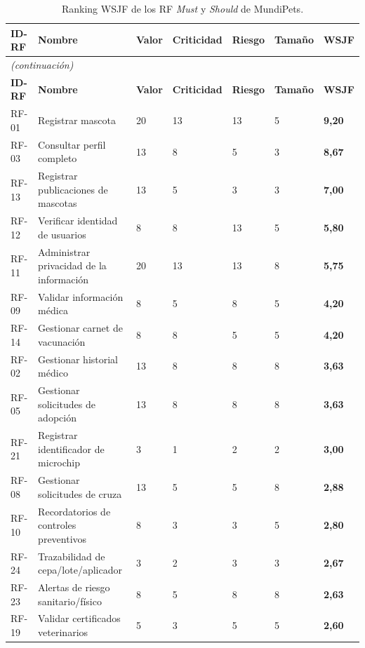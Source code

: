 \documentclass[journal,onecolumn]{IEEEtran}
\begin{document}
	\begin{longtable}{@{}p{1.4cm} p{5.4cm} p{1.5cm} p{1.5cm} p{1.5cm} p{1.5cm} p{1.3cm}@{}}
		\caption{Ranking WSJF de los RF \emph{Must} y \emph{Should} de MundiPets.}
		\label{tab:wsjf} \\
		\hline
		\textbf{ID-RF} & \textbf{Nombre} & \textbf{Valor} & \textbf{Criticidad} & \textbf{Riesgo} & \textbf{Tamaño} & \textbf{WSJF} \\
		\hline
		\endfirsthead
		\multicolumn{7}{|l|}{\textit{(continuación)}} \\
		\hline
		\textbf{ID-RF} & \textbf{Nombre} & \textbf{Valor} & \textbf{Criticidad} & \textbf{Riesgo} & \textbf{Tamaño} & \textbf{WSJF} \\
		\hline
		\endhead
		\hline
		\endfoot
		RF-01 & Registrar mascota & 20 & 13 & 13 & 5 & \textbf{9,20} \\
		\hline
		RF-03 & Consultar perfil completo & 13 & 8 & 5 & 3 & \textbf{8,67} \\
		\hline
		RF-13 & Registrar publicaciones de mascotas & 13 & 5 & 3 & 3 & \textbf{7,00} \\
		\hline
		RF-12 & Verificar identidad de usuarios & 8 & 8 & 13 & 5 & \textbf{5,80} \\
		\hline
		RF-11 & Administrar privacidad de la información & 20 & 13 & 13 & 8 & \textbf{5,75} \\
		\hline
		RF-09 & Validar información médica & 8 & 5 & 8 & 5 & \textbf{4,20} \\
		\hline
		RF-14 & Gestionar carnet de vacunación & 8 & 8 & 5 & 5 & \textbf{4,20} \\
		\hline
		RF-02 & Gestionar historial médico & 13 & 8 & 8 & 8 & \textbf{3,63} \\
		\hline
		RF-05 & Gestionar solicitudes de adopción & 13 & 8 & 8 & 8 & \textbf{3,63} \\
		\hline
		RF-21 & Registrar identificador de microchip & 3 & 1 & 2 & 2 & \textbf{3,00} \\
		\hline
		RF-08 & Gestionar solicitudes de cruza & 13 & 5 & 5 & 8 & \textbf{2,88} \\
		\hline
		RF-10 & Recordatorios de controles preventivos & 8 & 3 & 3 & 5 & \textbf{2,80} \\
		\hline
		RF-24 & Trazabilidad de cepa/lote/aplicador & 3 & 2 & 3 & 3 & \textbf{2,67} \\
		\hline
		RF-23 & Alertas de riesgo sanitario/físico & 8 & 5 & 8 & 8 & \textbf{2,63} \\
		\hline
		RF-19 & Validar certificados veterinarios & 5 & 3 & 5 & 5 & \textbf{2,60} \\

\end{longtable}
\end{document}
